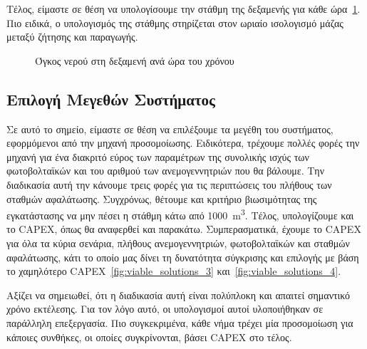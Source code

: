 Τέλος, είμαστε σε θέση να υπολογίσουμε την στάθμη της δεξαμενής για κάθε ώρα~\ref{fig:tank_level}.
Πιο ειδικά, ο υπολογισμός της στάθμης στηρίζεται στον ωριαίο ισολογισμό μάζας
μεταξύ ζήτησης και παραγωγής.

\begin{figure}
	\centering
	\caption{Όγκος νερού στη δεξαμενή ανά ώρα του χρόνου}\label{fig:tank_level}
\end{figure}

\subsection{Επιλογή Μεγεθών Συστήματος}

Σε αυτό το σημείο, είμαστε σε θέση να επιλέξουμε τα μεγέθη του συστήματος,
εφορμόμενοι από την μηχανή προσομοίωσης. Ειδικότερα, τρέχουμε πολλές φορές την
μηχανή για ένα διακριτό εύρος των παραμέτρων της συνολικής ισχύς των
φωτοβολταϊκών και του αριθμού των ανεμογεννητριών που θα βάλουμε. Την
διαδικασία αυτή την κάνουμε τρεις φορές για τις περιπτώσεις του πλήθους των
σταθμών αφαλάτωσης. Συγχρόνως, θέτουμε και κριτήριο βιωσιμότητας της
εγκατάστασης να μην πέσει η στάθμη κάτω από \qty{1000}{\cubic\meter}. Τέλος,
υπολογίζουμε και το CAPEX, όπως θα αναφερθεί και παρακάτω. Συμπερασματικά,
έχουμε το CAPEX για όλα τα κύρια σενάρια, πλήθους ανεμογεννητριών,
φωτοβολταϊκών και σταθμών αφαλάτωσης, κάτι το οποίο μας δίνει τη δυνατότητα
σύγκρισης και επιλογής με βάση το χαμηλότερο CAPEX~\ref{fig:viable_solutions_3}
και~\ref{fig:viable_solutions_4}.

Αξίζει να σημειωθεί, ότι η διαδικασία αυτή είναι πολύπλοκη και απαιτεί
σημαντικό χρόνο εκτέλεσης. Για τον λόγο αυτό, οι υπολογισμοί αυτοί υλοποιήθηκαν
σε παράλληλη επεξεργασία. Πιο συγκεκριμένα, κάθε νήμα τρέχει μία προσομοίωση
για κάποιες συνθήκες, οι οποίες συγκρίνονται, βάσει CAPEX στο τέλος.

